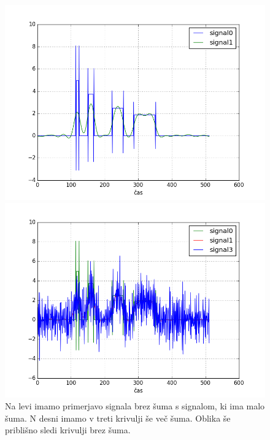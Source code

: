 \documentclass[slovene,11pt,a4paper]{article}
\numberwithin{equation}{section} %
\numberwithin{figure}{section} %
\numberwithin{table}{section} %
\begin{document}
\begin{figure}[h]
\centering
\begin{minipage}{0.5\textwidth}
\centering
\includegraphics[scale=0.4]{slike/druga_delna_rezultati.png}
\end{minipage}\hfill
\begin{minipage}{0.5\textwidth}
\centering
\includegraphics[scale=0.4]{slike/druga_delna_rezultati3.png}
\end{minipage}
\caption{Na levi imamo primerjavo signala brez šuma s signalom, ki ima malo šuma. N desni imamo v treti krivulji še več šuma. Oblika še priblišno sledi krivulji brez šuma.}
\end{figure}
\end{document}
